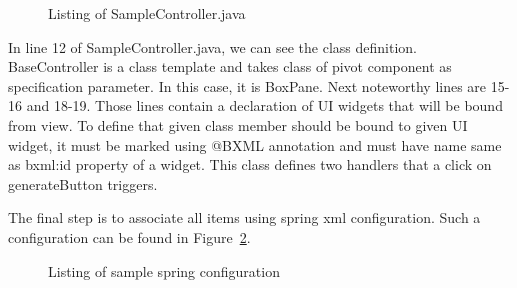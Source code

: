\pagebreak

\begin{figure}[ht]
\centering
 
\caption{Listing of SampleController.java}
\label{fig:sample_controller}
\end{figure} 

In line 12 of SampleController.java, we can see the class definition. BaseController is a class template and takes class of pivot component as specification parameter. In this case, it is BoxPane. Next noteworthy lines are 15-16 and 18-19. Those lines contain a declaration of UI widgets that will be bound from view. To define that given class member should be bound to given UI widget, it must be marked using @BXML annotation and must have name same as bxml:id property of a widget. This class defines two handlers that a click on generateButton triggers.

\pagebreak

The final step is to associate all items using spring xml configuration. Such a configuration can be found in Figure~\ref{fig:sample_spring}.

\begin{figure}[ht]
\centering
 
\caption{Listing of sample spring configuration}
\label{fig:sample_spring}
\end{figure}

